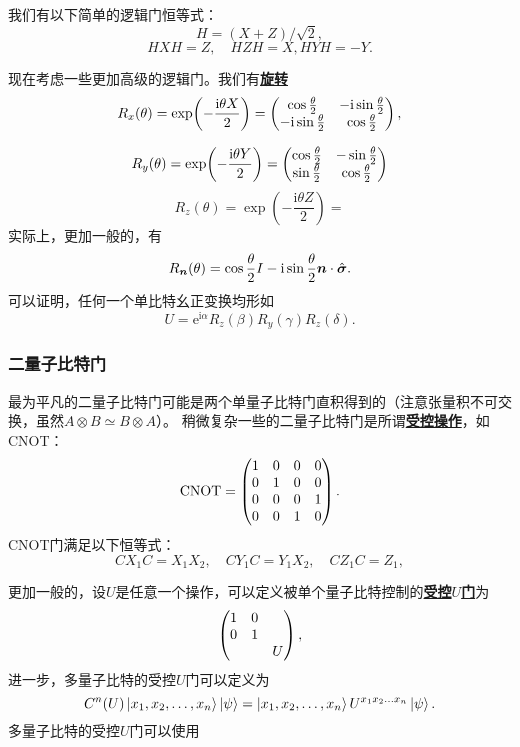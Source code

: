 \documentclass[hyperref, UTF8, a4paper]{ctexart}
\newcommand*{\ii}{\mathrm{i}}
\newcommand*{\ee}{\mathrm{e}}
\newcommand*{\concept}[1]{\underline{\textbf{#1}}}
\begin{document}
我们有以下简单的逻辑门恒等式：
\begin{equation}
    H = (X + Z) / \sqrt{2},
\end{equation}
\begin{equation}
    H X H = Z, \quad H Z H = X, H Y H = - Y.
\end{equation}

现在考虑一些更加高级的逻辑门。我们有\concept{旋转}
\begin{equation}
    R_x(\theta) = \exp(-\frac{\ii \theta X}{2}) = \pmqty{ \cos \frac{\theta}{2} & - \ii \sin \frac{\theta}{2} \\ - \ii \sin \frac{\theta}{2} & \cos \frac{\theta}{2} },
\end{equation}

\begin{equation}
    R_y(\theta) = \exp(-\frac{\ii \theta Y}{2}) = \pmqty{ \cos \frac{\theta}{2} & - \sin \frac{\theta}{2} \\ \sin \frac{\theta}{2} & \cos \frac{\theta}{2} }
\end{equation}
\begin{equation}
    R_z(\theta) = \exp(-\frac{\ii \theta Z}{2}) = 
\end{equation}
实际上，更加一般的，有
\begin{equation}
    R_{\vb*{n}}(\theta) = \cos \frac{\theta}{2} I - \ii \sin \frac{\theta}{2} \vb*{n} \cdot \hat{\vb*{\sigma}}.
\end{equation}
可以证明，任何一个单比特幺正变换均形如
\begin{equation}
    U = \ee^{\ii \alpha} R_z(\beta) R_y(\gamma) R_z(\delta).
\end{equation}

\subsubsection{二量子比特门}

最为平凡的二量子比特门可能是两个单量子比特门直积得到的（注意张量积不可交换，虽然$A \otimes B \simeq B \otimes A$）。
稍微复杂一些的二量子比特门是所谓\concept{受控操作}，如CNOT：
\begin{equation}
    \mathrm{CNOT} = \pmqty{1 & 0 & 0 & 0 \\ 0 & 1 & 0 & 0 \\ 0 & 0 & 0 & 1 \\ 0 & 0 & 1 & 0}.
\end{equation}
CNOT门满足以下恒等式：
\begin{equation}
    C X_1 C = X_1 X_2, \quad C Y_1 C = Y_1 X_2, \quad C Z_1 C = Z_1,
\end{equation}

更加一般的，设$U$是任意一个操作，可以定义被单个量子比特控制的\concept{受控$U$门}为
\begin{equation}
    \pmqty{\dmat{1 & 0 \\ 0 & 1, U}},
\end{equation}
进一步，多量子比特的受控$U$门可以定义为
\begin{equation}
    C^n(U) \ket{x_1, x_2, \ldots, x_n} \ket{\psi} = \ket{x_1, x_2, \ldots, x_n} U^{x_1 x_2 \ldots x_n} \ket{\psi}.
\end{equation}
多量子比特的受控$U$门可以使用
\end{document}
